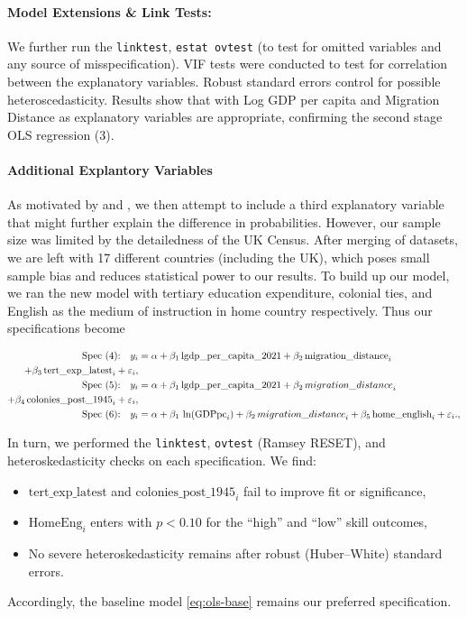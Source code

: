 \documentclass[12pt, a4paper]{article}
\begin{document}
\paragraph{Model Extensions \& Link Tests:}
 We further run the \texttt{linktest}, \texttt{estat ovtest} (to test for omitted variables and any source of misspecification). VIF tests were conducted to test for correlation between the explanatory variables. Robust standard errors control for possible heteroscedasticity. Results show that with Log GDP per capita and Migration Distance as explanatory variables are appropriate, confirming the second stage OLS regression (3).

\paragraph{Additional Explantory Variables}
As motivated by \citet{MattooBrainWaste} and \citet{LindleyUKOverEd}, we then attempt to include a third explanatory variable that might further explain the difference in probabilities. However, our sample size was limited by the detailedness of the UK Census. After merging of datasets, we are left with 17 different countries (including the UK), which poses small sample bias and reduces statistical power to our results. To build up our model, we ran the new model with tertiary education expenditure, colonial ties, and English as the medium of instruction in home country respectively. Thus our specifications become

\begin{align}
  \text{Spec (4):}\quad
  y_i &= \alpha + \beta_1\,\text{lgdp\_per\_capita\_2021}
           + \beta_2\,\text{migration\_distance}_i \\
           + \beta_3\,\text{tert\_exp\_latest}_i  + \varepsilon_i,
           \notag\\
  \text{Spec (5):}\quad
  y_i &= \alpha + \beta_1\,\text{lgdp\_per\_capita\_2021}
           + \beta_2\,{migration\_distance}_i\\
           + \beta_4\,\text{colonies\_post\_1945}_i + \varepsilon_i,
           \label{eq:ols-extended}\\        
  \text{Spec (6):}\quad
  y_i &= \alpha + \beta_1\,\ln(\text{GDPpc}_i)
           + \beta_2\,{migration\_distance}_i
           + \beta_5\,\text{home\_english}_i + \varepsilon_i., 
           \notag
\end{align}

In turn, we performed the \texttt{linktest}, \texttt{ovtest} (Ramsey RESET), and heteroskedasticity checks on each specification.  We find:
\begin{itemize}
  \item $\text{tert\_exp\_latest}$ and $\text{colonies\_post\_1945}_i$ fail to improve fit or significance,
  \item $\text{HomeEng}_i$ enters with $p<0.10$ for the “high” and “low” skill outcomes,
  \item No severe heteroskedasticity remains after robust (Huber–White) standard errors.
\end{itemize}
Accordingly, the baseline model \eqref{eq:ols-base} remains our preferred specification.
\end{document}
